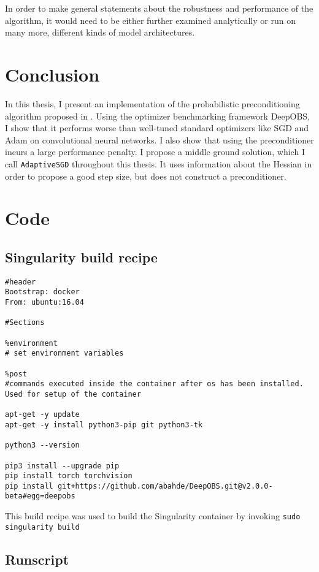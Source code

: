 \documentclass[twoside,12pt,a4paper]{report}
\begin{document}
In order to make general statements about the robustness and performance of the algorithm, it would need to be either further examined analytically or run on many more, different kinds of model architectures.


\chapter{Conclusion}
In this thesis, I present an implementation of the probabilistic preconditioning algorithm proposed in \cite{roos2019active}. Using the optimizer benchmarking framework DeepOBS,  I show that it performs worse than well-tuned standard optimizers like SGD and Adam on convolutional neural networks. I also show that using the preconditioner incurs a large performance penalty. I propose a middle ground solution, which I call \verb|AdaptiveSGD| throughout this thesis. It uses information about the Hessian in order to propose a good step size, but does not construct a preconditioner.


\appendix %
\chapter{Code}
\section{Singularity build recipe}
\begin{verbatim}
#header
Bootstrap: docker
From: ubuntu:16.04

#Sections

%environment
# set environment variables

%post
#commands executed inside the container after os has been installed. Used for setup of the container

apt-get -y update
apt-get -y install python3-pip git python3-tk

python3 --version

pip3 install --upgrade pip
pip install torch torchvision
pip install git+https://github.com/abahde/DeepOBS.git@v2.0.0-beta#egg=deepobs

\end{verbatim}
This build recipe was used to build the Singularity container by invoking \verb|sudo singularity build|


\section{Runscript}
\end{document}
